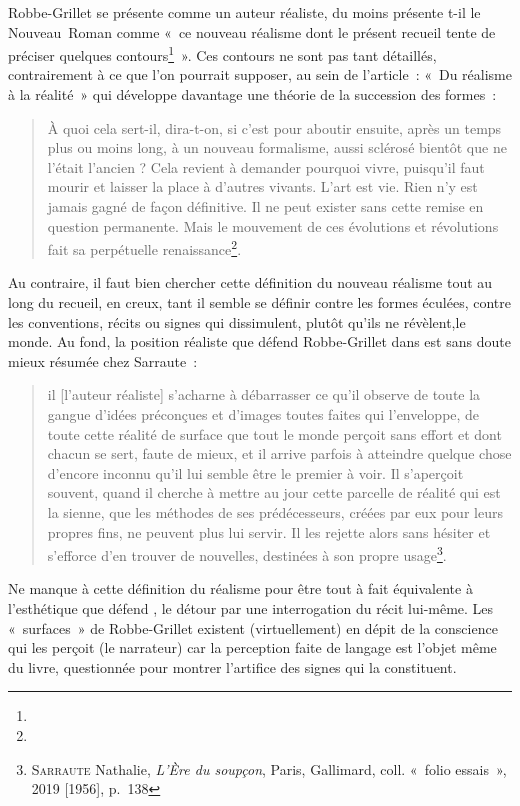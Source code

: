 Robbe-Grillet se présente comme un auteur réaliste, du moins présente t-il le Nouveau~Roman comme «~ce nouveau réalisme dont le présent recueil tente de préciser quelques contours\footnote{}~». Ces contours ne sont pas tant détaillés, contrairement à ce que l'on pourrait supposer, au sein de l'article~: «~Du réalisme à la réalité~» qui développe davantage une théorie de la succession des formes~:
\begin{quote}
    À quoi cela sert-il, dira-t-on, si c’est pour aboutir ensuite, après un temps plus ou moins long, à un nouveau formalisme, aussi sclérosé bientôt que ne l’était l’ancien ? Cela revient à demander pourquoi vivre, puisqu’il faut mourir et laisser la place à d’autres vivants. L’art est vie. Rien n’y est jamais gagné de façon définitive. Il ne peut exister sans cette remise en question permanente. Mais le mouvement de ces évolutions et révolutions fait sa perpétuelle renaissance\footnote{}.
\end{quote}
Au contraire, il faut bien chercher cette définition du nouveau réalisme tout au long du recueil, en creux, tant il semble se définir contre les formes éculées, contre les conventions, récits ou signes qui dissimulent, plutôt qu'ils ne révèlent,le monde. Au fond, la position réaliste que défend Robbe-Grillet dans \punr{} est sans doute mieux résumée chez Sarraute~: 
\begin{quote}
    il [l'auteur réaliste] s'acharne à débarrasser ce qu'il observe de toute la gangue d'idées préconçues et d'images toutes faites qui l'enveloppe, de toute cette réalité de surface que tout le monde perçoit sans effort et dont chacun se sert, faute de mieux, et il arrive parfois à atteindre quelque chose d'encore inconnu qu'il lui semble être le premier à voir. Il s'aperçoit souvent, quand il cherche à mettre au jour cette parcelle de réalité qui est la sienne, que les méthodes de ses prédécesseurs, créées par eux pour leurs propres fins, ne peuvent plus lui servir. Il les rejette alors sans hésiter et s'efforce d'en trouver de nouvelles, destinées à son propre usage\footnote{\textsc{Sarraute} Nathalie, \textit{L'Ère du soupçon}, Paris, Gallimard, coll. «~folio essais~», 2019 [1956], p.~138}.
\end{quote}
Ne manque à cette définition du réalisme pour être tout à fait équivalente à l'esthétique que défend \punr, le détour par une interrogation du récit lui-même. Les «~surfaces~» de Robbe-Grillet existent (virtuellement) en dépit de la conscience qui les perçoit (le narrateur) car la perception faite de langage est l'objet même du livre, questionnée pour montrer l'artifice des signes qui la constituent.

